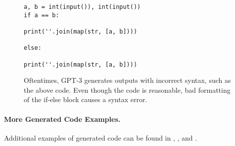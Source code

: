 \begin{figure*}
 \begin{small}
 \begin{verbatim}
a, b = int(input()), int(input())
if a == b:

print(''.join(map(str, [a, b])))

else:

print(''.join(map(str, [a, b])))
\end{verbatim}
 \end{small}
    \caption{Oftentimes, GPT-3 generates outputs with incorrect syntax, such as the above code. Even though the code is reasonable, bad formatting of the if-else block causes a syntax error.}
    \label{fig:bad_syntax_GPT3}
\end{figure*}




\paragraph{More Generated Code Examples.} Additional examples of generated code can be found in , , and .

